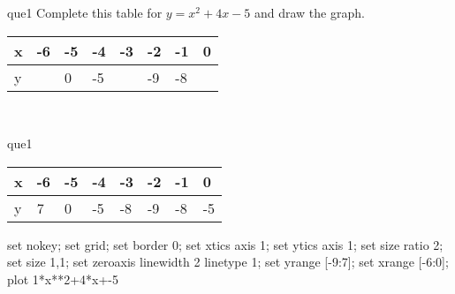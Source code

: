 \documentclass[13.5pt, varwidth=true]{beamer}
\begin{document}
\begin{frame}[shrink=19,fragile]
	\begin{beamercolorbox}[rounded=true, left, shadow=true,wd=14.8cm]{que1}
		 Complete this table for $y = x^{2} + 4x - 5$ and draw the graph. \\[0.3cm] \renewcommand{\arraystretch}{1.2}\begin{tabular}{|C|C|C|C|C|C|C|C|} \hline x & -6 & -5 & -4 & -3 & -2 & -1 & 0 \\ \hline y &  & 0 & -5 &  & -9 & -8 & \\ \hline \end{tabular}\\[0.3cm]
	\end{beamercolorbox}
\end{frame}
\begin{frame}[shrink=19,fragile]
	\begin{beamercolorbox}[rounded=true, left, shadow=true,wd=14.8cm]{que1}
		\renewcommand{\arraystretch}{1.2}\begin{tabular}{|C|C|C|C|C|C|C|C|} \hline x & -6 & -5 & -4 & -3 & -2 & -1 & 0 \\ \hline y & 7 & 0 & -5 & -8 & -9 & -8 & -5\\ \hline \end{tabular}\begin{gnuplot}[terminal=pdf] set nokey; set grid; set border 0; set xtics axis 1; set ytics axis 1; set size ratio 2; set size 1,1; set zeroaxis linewidth 2 linetype 1; set yrange [-9:7]; set xrange [-6:0]; plot 1*x**2+4*x+-5 \end{gnuplot}
	\end{beamercolorbox}
\end{frame}
\end{document}
